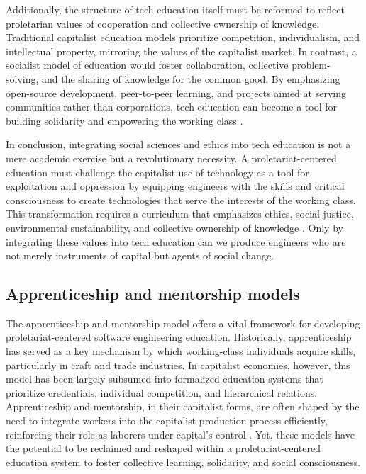 \begin{refsection}
Additionally, the structure of tech education itself must be reformed to reflect proletarian values of cooperation and collective ownership of knowledge. Traditional capitalist education models prioritize competition, individualism, and intellectual property, mirroring the values of the capitalist market. In contrast, a socialist model of education would foster collaboration, collective problem-solving, and the sharing of knowledge for the common good. By emphasizing open-source development, peer-to-peer learning, and projects aimed at serving communities rather than corporations, tech education can become a tool for building solidarity and empowering the working class \cite[pp.~58]{kling1996computerization}.

In conclusion, integrating social sciences and ethics into tech education is not a mere academic exercise but a revolutionary necessity. A proletariat-centered education must challenge the capitalist use of technology as a tool for exploitation and oppression by equipping engineers with the skills and critical consciousness to create technologies that serve the interests of the working class. This transformation requires a curriculum that emphasizes ethics, social justice, environmental sustainability, and collective ownership of knowledge \cite[pp.~45]{marx2008capital}. Only by integrating these values into tech education can we produce engineers who are not merely instruments of capital but agents of social change.

\subsection{Apprenticeship and mentorship models}

The apprenticeship and mentorship model offers a vital framework for developing proletariat-centered software engineering education. Historically, apprenticeship has served as a key mechanism by which working-class individuals acquire skills, particularly in craft and trade industries. In capitalist economies, however, this model has been largely subsumed into formalized education systems that prioritize credentials, individual competition, and hierarchical relations. Apprenticeship and mentorship, in their capitalist forms, are often shaped by the need to integrate workers into the capitalist production process efficiently, reinforcing their role as laborers under capital’s control \cite[pp.~56]{braverman1999labor}. Yet, these models have the potential to be reclaimed and reshaped within a proletariat-centered education system to foster collective learning, solidarity, and social consciousness.


\end{refsection}
